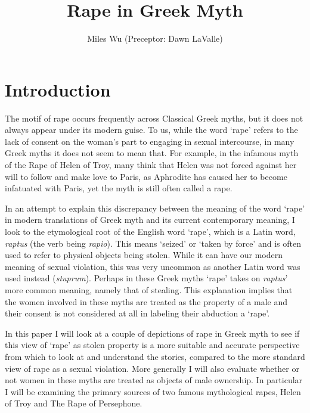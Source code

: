 \documentclass[11pt]{article}
\begin{document}
\title{Rape in Greek Myth}
\author{Miles Wu (Preceptor: Dawn LaValle)}
\maketitle

\begin{abstract}

\end{abstract}

\newpage

\section{Introduction}
The motif of rape occurs frequently across Classical Greek myths, but it does not always appear under its modern guise.
To us, while the word `rape' refers to the lack of consent on the woman's part to engaging in sexual intercourse, in many Greek myths it does not seem to mean that.
For example, in the infamous myth of the Rape of Helen of Troy, many think that Helen was not  forced against her will to follow and make love to Paris, as Aphrodite has caused her to become infatuated with Paris, yet the myth is still often called a rape.

In an attempt to explain this discrepancy between the meaning of the word `rape' in modern translations of Greek myth and its current contemporary meaning, I look to the etymological root of the English word `rape', which is a Latin word, \emph{raptus} (the verb being \emph{rapio}).
This means `seized' or `taken by force' and is often used to refer to physical objects being stolen.
While it can have our modern meaning of sexual violation, this was very uncommon as another Latin word was used instead (\emph{stuprum}).
Perhaps in these Greek myths `rape' takes on \emph{raptus}' more common meaning, namely that of stealing.
This explanation implies that the women involved in these myths are treated as the property of a male and their consent is not considered at all in labeling their abduction a `rape'.

In this paper I will look at a couple of depictions of rape in Greek myth to see if this view of `rape' as stolen property is a more suitable and accurate perspective from which to look at and understand the stories, compared to the more standard view of rape as a sexual violation.
More generally I will also evaluate whether or not women in these myths are treated as objects of male ownership.
In particular I will be examining the primary sources of two famous mythological rapes, Helen of Troy and The Rape of Persephone.
\end{document}
